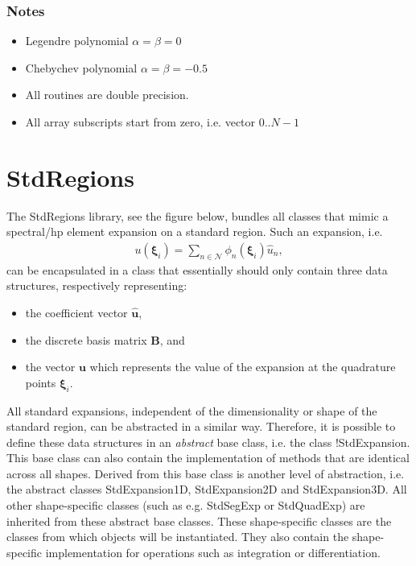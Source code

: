 \subsubsection{Notes}
\begin{itemize}
\item Legendre polynomial $\alpha = \beta = 0$
\item Chebychev polynomial $\alpha = \beta = -0.5$
\item All routines are double precision.
\item All array subscripts start from zero, i.e. vector $0..N-1$
\end{itemize}

\section{StdRegions}
The StdRegions library, see the figure below, bundles all classes that mimic a
spectral/hp element expansion on a standard region. Such an expansion, i.e.
\begin{align*}
u(\boldsymbol{\xi}_i) =
  \sum_{n\in\mathcal{N}}\phi_n(\boldsymbol{\xi}_i)\hat{u}_n,
\end{align*}
can be encapsulated in a class that essentially should only contain three data
structures, respectively representing:

\begin{itemize}
\item the coefficient vector $\hat{\boldsymbol{u}}$,
\item the discrete basis matrix $\boldsymbol{B}$, and
\item the vector $\boldsymbol{u}$ which represents the value of the expansion
at the quadrature points $\boldsymbol{\xi}_i$.
\end{itemize}

All standard expansions, independent of the dimensionality or shape of the
standard region, can be abstracted in a similar way. Therefore, it is possible
to define these data structures in an \emph{abstract} base class, i.e. the
class !StdExpansion. This base class can also contain the implementation of methods
that are identical across all shapes. Derived from this base class is another
level of abstraction, i.e. the abstract classes StdExpansion1D, StdExpansion2D
and StdExpansion3D. All other shape-specific classes (such as e.g. StdSegExp or
StdQuadExp) are inherited from these abstract base classes. These
shape-specific classes are the classes from which objects will be instantiated.
They also contain the shape-specific implementation for operations such as
integration or differentiation.

